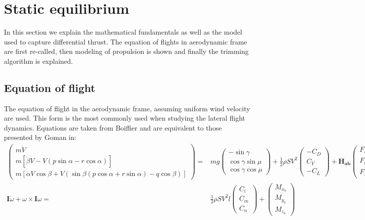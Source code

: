 \section{Static equilibrium}
In this section we explain the mathematical fundamentals as well as the model used to capture differential thrust. The equation of flights in aerodynamic frame are first re-called, then modeling of propulsion is shown and finally the trimming algorithm is explained.

\subsection{Equation of flight}
The equation of flight in the aerodynamic frame, assuming uniform wind velocity are used. This form is the most commonly used when studying the lateral flight dynamics. Equations are taken from Boiffier \cite{Boiffier} and are equivalent to those presented by Goman in\cite{GomanAttainableEqui}:
\begin{align}
	\begin{pmatrix}
	m \dot{V} \\
	m\left[ \dot{\beta}V -V(p\sin\alpha - r\cos\alpha) \right]\\
	m\left[ \dot{\alpha} V \cos\beta + V\left(\sin\beta (p\cos\alpha + r\sin\alpha) - q\cos\beta\right)\right]
	\end{pmatrix}
	= & mg
	\begin{pmatrix}
	-\sin\gamma\\
	\cos\gamma \sin\mu\\
	\cos\gamma \cos\mu	
	\end{pmatrix}
	+ \frac{1}{2} \rho S V^2
	\begin{pmatrix}
	-C_D\\
	C_Y\\
	-C_L
	\end{pmatrix}
	+ \mathbf{H_{ab}} 
	\begin{pmatrix}
	F_{x_b}\\
	F_{y_b}\\
	F_{z_b}
	\end{pmatrix} \label{E:Sdtdebut}\\
	\textbf{I}\dot{\omega} + \omega \times \textbf{I}\omega =& \frac{1}{2} \rho S V^2 l
	\begin{pmatrix}
	C_l\\
	C_m\\
	C_n
	\end{pmatrix}
	+
	\begin{pmatrix}
	M_{x_b}\\
	M_{y_b}\\
	M_{z_b}
	\end{pmatrix} \label{E:sdtMoments}
\end{align}

